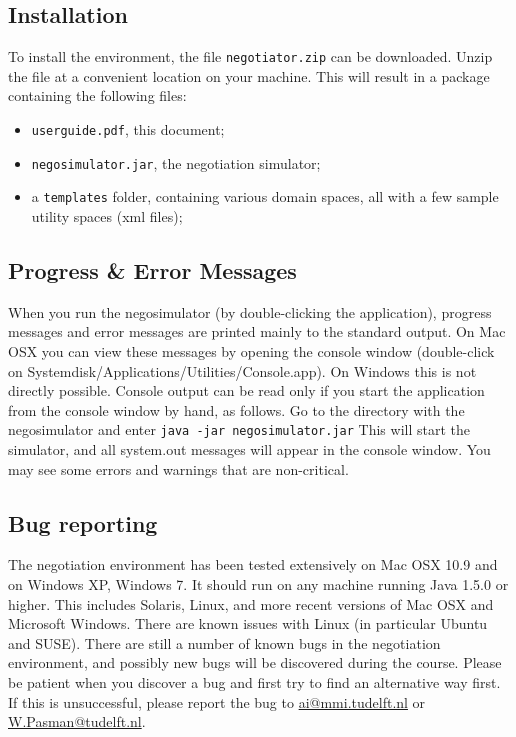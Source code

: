 \documentclass[]{article}
\begin{document}
\subsection{Installation}
To install the environment, the file \texttt{negotiator.zip} can be downloaded. Unzip the file at a convenient location on your machine. This will result in a package containing the following files:

\begin{itemize}
	\item \texttt{userguide.pdf}, this document;
	\item \texttt{negosimulator.jar}, the negotiation simulator;
	\item a \texttt{templates} folder, containing various domain spaces, all with a few sample utility spaces (xml files);
\end{itemize}

\subsection{Progress \& Error Messages}
When you run the negosimulator (by double-clicking the application), progress messages and error messages are printed mainly to the standard output. On Mac OSX you can view these messages by opening the console window (double-click on Systemdisk/Applications/Utilities/Console.app). On Windows this is not directly possible. Console output can be read only if you start the application from the console window by hand, as follows. Go to the directory with the negosimulator and enter
\texttt{java -jar negosimulator.jar}
This will start the simulator, and all system.out messages will appear in the console window. You may see some errors and warnings that are non-critical.

\subsection{Bug reporting}
The negotiation environment has been tested extensively on Mac OSX 10.9 and on Windows XP, Windows 7. It should run on any machine running Java 1.5.0 or higher. This includes Solaris, Linux, and more recent versions of Mac OSX and Microsoft Windows. There are known issues with Linux (in particular Ubuntu and SUSE). There are still a number of known bugs in the negotiation environment, and possibly new bugs will be discovered during the course. Please be patient when you discover a bug and first try to find an alternative way first. If this is unsuccessful, please report the bug to \url{ai@mmi.tudelft.nl} or \url{W.Pasman@tudelft.nl}.
 
\end{document}
